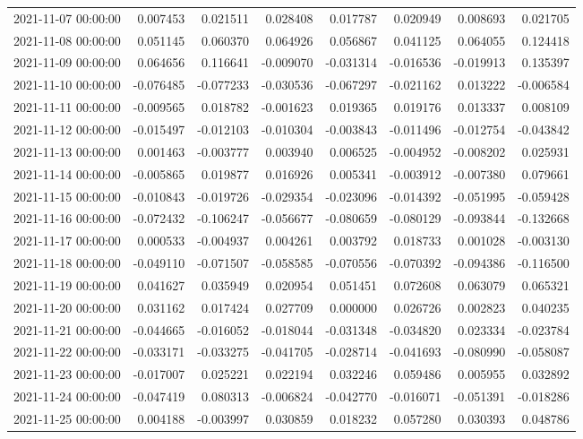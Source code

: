 \begin{tabular}{lrrrrrrr}
2021-11-07 00:00:00 & 0.007453 & 0.021511 & 0.028408 & 0.017787 & 0.020949 & 0.008693 & 0.021705 \\
2021-11-08 00:00:00 & 0.051145 & 0.060370 & 0.064926 & 0.056867 & 0.041125 & 0.064055 & 0.124418 \\
2021-11-09 00:00:00 & 0.064656 & 0.116641 & -0.009070 & -0.031314 & -0.016536 & -0.019913 & 0.135397 \\
2021-11-10 00:00:00 & -0.076485 & -0.077233 & -0.030536 & -0.067297 & -0.021162 & 0.013222 & -0.006584 \\
2021-11-11 00:00:00 & -0.009565 & 0.018782 & -0.001623 & 0.019365 & 0.019176 & 0.013337 & 0.008109 \\
2021-11-12 00:00:00 & -0.015497 & -0.012103 & -0.010304 & -0.003843 & -0.011496 & -0.012754 & -0.043842 \\
2021-11-13 00:00:00 & 0.001463 & -0.003777 & 0.003940 & 0.006525 & -0.004952 & -0.008202 & 0.025931 \\
2021-11-14 00:00:00 & -0.005865 & 0.019877 & 0.016926 & 0.005341 & -0.003912 & -0.007380 & 0.079661 \\
2021-11-15 00:00:00 & -0.010843 & -0.019726 & -0.029354 & -0.023096 & -0.014392 & -0.051995 & -0.059428 \\
2021-11-16 00:00:00 & -0.072432 & -0.106247 & -0.056677 & -0.080659 & -0.080129 & -0.093844 & -0.132668 \\
2021-11-17 00:00:00 & 0.000533 & -0.004937 & 0.004261 & 0.003792 & 0.018733 & 0.001028 & -0.003130 \\
2021-11-18 00:00:00 & -0.049110 & -0.071507 & -0.058585 & -0.070556 & -0.070392 & -0.094386 & -0.116500 \\
2021-11-19 00:00:00 & 0.041627 & 0.035949 & 0.020954 & 0.051451 & 0.072608 & 0.063079 & 0.065321 \\
2021-11-20 00:00:00 & 0.031162 & 0.017424 & 0.027709 & 0.000000 & 0.026726 & 0.002823 & 0.040235 \\
2021-11-21 00:00:00 & -0.044665 & -0.016052 & -0.018044 & -0.031348 & -0.034820 & 0.023334 & -0.023784 \\
2021-11-22 00:00:00 & -0.033171 & -0.033275 & -0.041705 & -0.028714 & -0.041693 & -0.080990 & -0.058087 \\
2021-11-23 00:00:00 & -0.017007 & 0.025221 & 0.022194 & 0.032246 & 0.059486 & 0.005955 & 0.032892 \\
2021-11-24 00:00:00 & -0.047419 & 0.080313 & -0.006824 & -0.042770 & -0.016071 & -0.051391 & -0.018286 \\
2021-11-25 00:00:00 & 0.004188 & -0.003997 & 0.030859 & 0.018232 & 0.057280 & 0.030393 & 0.048786 \\

\end{tabular}
